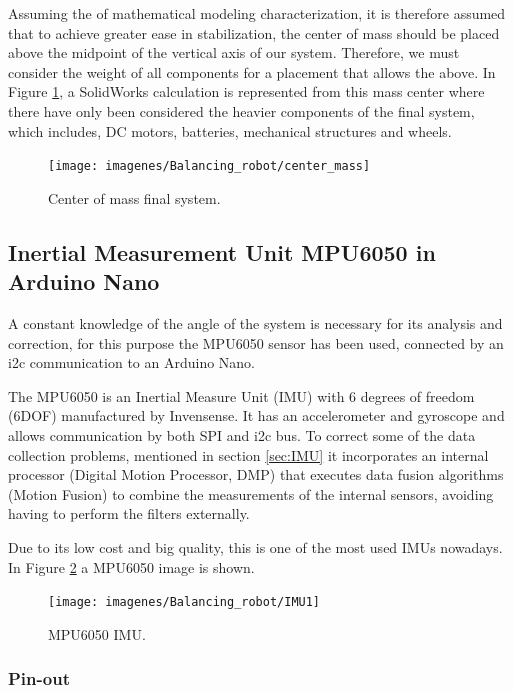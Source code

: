 Assuming the of mathematical modeling characterization, it is therefore assumed that to achieve greater ease in stabilization, the center of mass should be placed above the midpoint of the vertical axis of our system. Therefore, we must consider the weight of all components for a placement that allows the above. \newline
In Figure \ref{fig:center_mass}, a SolidWorks calculation is represented from this mass center where there have only been considered the heavier components of the final system, which includes, DC motors, batteries, mechanical structures and wheels.

\begin{figure}[H]
	\center
	\texttt{[image: imagenes/Balancing\_robot/center\_mass]}
	\caption{Center of mass final system.}
	\label{fig:center_mass}
\end{figure}

\subsection{Inertial Measurement Unit MPU6050 in Arduino Nano}\label{sec:MPU6050}

A constant knowledge of the angle of the system is necessary for its analysis and correction, for this purpose the MPU6050 sensor has been used, connected by an i2c communication to an Arduino Nano. \newline

The MPU6050 is an Inertial Measure Unit (IMU) with 6 degrees of freedom (6DOF) manufactured by Invensense. It has an accelerometer and gyroscope and allows communication by both SPI and i2c bus. To correct some of the data collection problems, mentioned in section \ref{sec:IMU} it incorporates an internal processor (Digital Motion Processor, DMP) that executes data fusion algorithms (Motion Fusion) to combine the measurements of the internal sensors, avoiding having to perform the filters externally.\newline

Due to its low cost and big quality, this is one of the most used IMUs nowadays. In Figure \ref{fig:IMU1} a MPU6050 image is shown.

\begin{figure}[H]
	\center
	\texttt{[image: imagenes/Balancing\_robot/IMU1]}
	\caption{MPU6050 IMU.}
	\label{fig:IMU1}
\end{figure}
\subsubsection{Pin-out}

